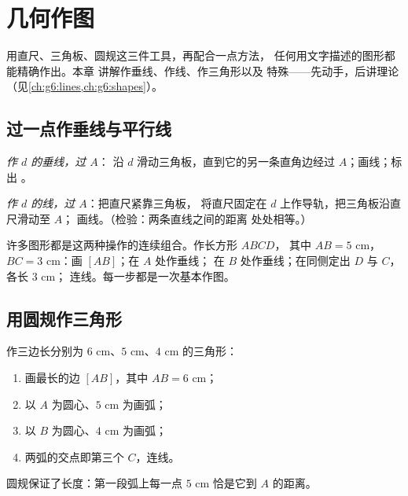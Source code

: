 \chapter{几何作图}\label{ch:g5:geometry}

用直尺、三角板、圆规这三件工具，再配合一点方法，
任何用文字描述的图形都能精确作出。本章
讲解作垂线、作线、作三角形以及
特殊——先动手，后讲理论
（见\cref{ch:g6:lines,ch:g6:shapes}）。

\section{过一点作垂线与平行线}

\begin{method}[两种基本作图]\label{met:g5:geometry:basic}
\emph{作 $d$ 的垂线，过 $A$}：
沿 $d$ 滑动三角板，直到它的另一条直角边经过 $A$；画线；标出
。

\emph{作 $d$ 的线，过 $A$}：把直尺紧靠三角板，
将直尺固定在 $d$ 上作导轨，把三角板沿直尺滑动至 $A$；
画线。（检验：两条直线之间的距离
处处相等。）
\end{method}

\begin{example}[连续作图]\label{ex:g5:geometry:chain}
许多图形都是这两种操作的连续组合。作长方形 $ABCD$，
其中 $AB = 5$ cm，$BC = 3$ cm：画 $[AB]$；在 $A$ 处作垂线；
在 $B$ 处作垂线；在同侧定出 $D$ 与 $C$，各长 $3$ cm；
连线。每一步都是一次基本作图。
\end{example}

\section{用圆规作三角形}

\begin{method}[已知三边作三角形]\label{met:g5:geometry:triangle}
作三边长分别为 $6$ cm、$5$ cm、$4$ cm 的三角形：
\begin{enumerate}
  \item 画最长的边 $[AB]$，其中 $AB = 6$ cm；
  \item 以 $A$ 为圆心、$5$ cm 为画弧；
  \item 以 $B$ 为圆心、$4$ cm 为画弧；
  \item 两弧的交点即第三个 $C$，连线。
\end{enumerate}
圆规保证了长度：第一段弧上每一点
$5$ cm 恰是它到 $A$ 的距离。
\end{method}

